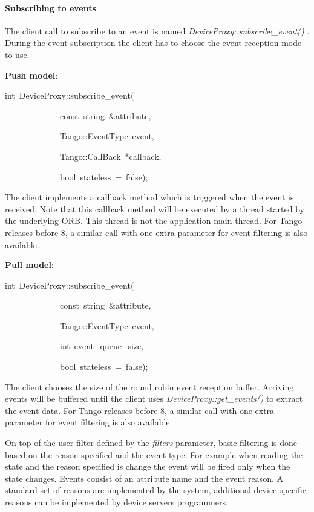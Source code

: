 \paragraph{Subscribing to events}

The client call to subscribe to an event is named \emph{DeviceProxy::subscribe\_event()}
. During the event subscription the client has to choose the event
reception mode to use. 

\textbf{Push model}:
\begin{lyxcode}
int~DeviceProxy::subscribe\_event(~

~~~~~~~~~~~~~const~string~\&attribute,~

~~~~~~~~~~~~~Tango::EventType~event,~

~~~~~~~~~~~~~Tango::CallBack~{*}callback,

~~~~~~~~~~~~~bool~stateless~=~false);
\end{lyxcode}
The client implements a callback method which is triggered when the
event is received. Note that this callback method will be executed
by a thread started by the underlying ORB. This thread is not the
application main thread. For Tango releases before 8, a similar call
with one extra parameter for event filtering is also available.

\textbf{Pull model}:
\begin{lyxcode}
int~DeviceProxy::subscribe\_event(~

~~~~~~~~~~~~~const~string~\&attribute,~

~~~~~~~~~~~~~Tango::EventType~event,~

~~~~~~~~~~~~~int~event\_queue\_size,

~~~~~~~~~~~~~bool~stateless~=~false);
\end{lyxcode}
The client chooses the size of the round robin event reception buffer.
Arriving events will be buffered until the client uses \emph{DeviceProxy::get\_events()}
to extract the event data. For Tango releases before 8, a similar
call with one extra parameter for event filtering is also available.

On top of the user filter defined by the \emph{filters} parameter,
basic filtering is done based on the reason specified and the event
type. For example when reading the state and the reason specified
is \textquotedbl{}change\textquotedbl{} the event will be fired only
when the state changes. Events consist of an attribute name and the
event reason. A standard set of reasons are implemented by the system,
additional device specific reasons can be implemented by device servers
programmers. 

